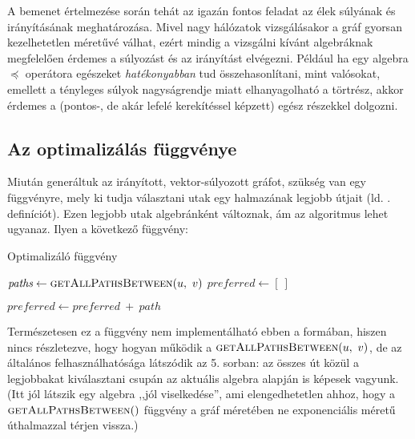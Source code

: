       A bemenet értelmezése során tehát az igazán fontos feladat az élek súlyának és irányításának meghatározása. Mivel nagy hálózatok vizsgálásakor a gráf gyorsan kezelhetetlen méretűvé válhat, ezért mindig a vizsgálni kívánt algebráknak megfelelően érdemes a súlyozást és az irányítást elvégezni. Például ha egy algebra $\preceq$ operátora egészeket \textit{hatékonyabban} tud összehasonlítani, mint valósokat, emellett a tényleges súlyok nagyságrendje miatt elhanyagolható a törtrész, akkor érdemes a (pontos-, de akár lefelé kerekítéssel képzett) egész részekkel dolgozni.

      \subsection{Az optimalizálás függvénye}
      Miután generáltuk az irányított, vektor-súlyozott gráfot, szükség van egy függvényre, mely ki tudja választani utak egy halmazának legjobb útjait (ld. . definíciót). Ezen legjobb utak algebránként változnak, ám az algoritmus lehet ugyanaz. Ilyen a következő függvény:

      \begin{algorithm}
        \caption{Optimalizáló függvény}\label{algo_optimalizalo}
        \begin{algorithmic}[1]
            \State $\textit{paths} \gets \Call{getAllPathsBetween}{u,~v}$
            \State $\textit{preferred} \gets [~]$

                \State $\textit{preferred} \gets \textit{preferred}~+~path$
              \EndIf
            \EndFor
          \EndProcedure
        \end{algorithmic}
      \end{algorithm}

      Természetesen ez a függvény nem implementálható ebben a formában, hiszen nincs részletezve, hogy hogyan működik a $\Call{getAllPathsBetween}{u,~v}$, de az általános felhasználhatósága látszódik az 5. sorban: az összes út közül a legjobbakat kiválasztani csupán az aktuális algebra alapján is képesek vagyunk. (Itt jól látszik egy algebra ,,jól viselkedése'', ami elengedhetetlen ahhoz, hogy a $\Call{getAllPathsBetween}$ függvény a gráf méretében ne exponenciális méretű úthalmazzal térjen vissza.)\\

